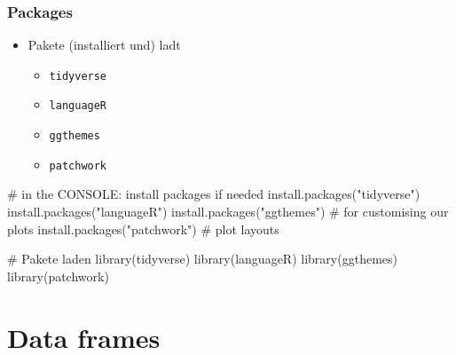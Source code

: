 \documentclass[
  letterpaper,
  DIV=11]{scrartcl}
\newenvironment{Shaded}{\begin{snugshade}}{\end{snugshade}}
\newcommand{\CommentTok}[1]{\textcolor[rgb]{0.37,0.37,0.37}{#1}}
\newcommand{\FunctionTok}[1]{\textcolor[rgb]{0.28,0.35,0.67}{#1}}
\newcommand{\NormalTok}[1]{\textcolor[rgb]{0.00,0.23,0.31}{#1}}
\newcommand{\StringTok}[1]{\textcolor[rgb]{0.13,0.47,0.30}{#1}}
\providecommand{\tightlist}{%
  \setlength{\itemsep}{0pt}\setlength{\parskip}{0pt}}\usepackage{longtable,booktabs,array}
\theoremstyle{definition}
\theoremstyle{remark}
\begin{document}
\hypertarget{packages}{%
\subsubsection{Packages}\label{packages}}

\begin{itemize}
\tightlist
\item
  Pakete (installiert und) ladt

  \begin{itemize}
  \tightlist
  \item
    \texttt{tidyverse}
  \item
    \texttt{languageR}
  \item
    \texttt{ggthemes}
  \item
    \texttt{patchwork}
  \end{itemize}
\end{itemize}

\begin{Shaded}
\begin{Highlighting}[]
\CommentTok{\# in the CONSOLE: install packages if needed}
\FunctionTok{install.packages}\NormalTok{(}\StringTok{"tidyverse"}\NormalTok{)}
\FunctionTok{install.packages}\NormalTok{(}\StringTok{"languageR"}\NormalTok{)}
\FunctionTok{install.packages}\NormalTok{(}\StringTok{"ggthemes"}\NormalTok{) }\CommentTok{\# for customising our plots}
\FunctionTok{install.packages}\NormalTok{(}\StringTok{"patchwork"}\NormalTok{) }\CommentTok{\# plot layouts}
\end{Highlighting}
\end{Shaded}

\begin{Shaded}
\begin{Highlighting}[]
\CommentTok{\# Pakete laden}
\FunctionTok{library}\NormalTok{(tidyverse)}
\FunctionTok{library}\NormalTok{(languageR)}
\FunctionTok{library}\NormalTok{(ggthemes)}
\FunctionTok{library}\NormalTok{(patchwork)}
\end{Highlighting}
\end{Shaded}

\hypertarget{data-frames}{%
\section{Data frames}\label{data-frames}}
\end{document}
